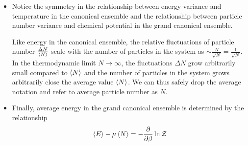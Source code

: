 \documentclass[11pt, a4paper]{article}
\begin{document}
\begin{itemize}
\begin{itemize}
		\item Notice the symmetry in the relationship between energy variance and temperature in the canonical ensemble and the relationship between particle number variance and chemical potential in the grand canonical ensemble. 
		
		Like energy in the canonical ensemble, the relative fluctuations of particle number $ \frac{\Delta N}{\expval{N}} $ scale with the number of particles in the system as $ \sim \frac{N}{\sqrt{N}} = \frac{1}{\sqrt{N}}$. In the thermodynamic limit $ N \to \infty $, the fluctuations $ \Delta N $ grow arbitrarily small compared to $ \expval{N} $ and the number of particles in the system grows arbitrarily close the average value $ \expval{N} $. We can thus safely drop the average notation and refer to average particle number as $ N $.
		
		\item Finally, average energy in the grand canonical ensemble is determined by the relationship
		\begin{equation*}
			\expval{E} - \mu \expval{N} = - \pdv{}{\beta}\ln \mathcal{Z}
		\end{equation*}
	\end{itemize}
	
\end{itemize}
\end{document}

